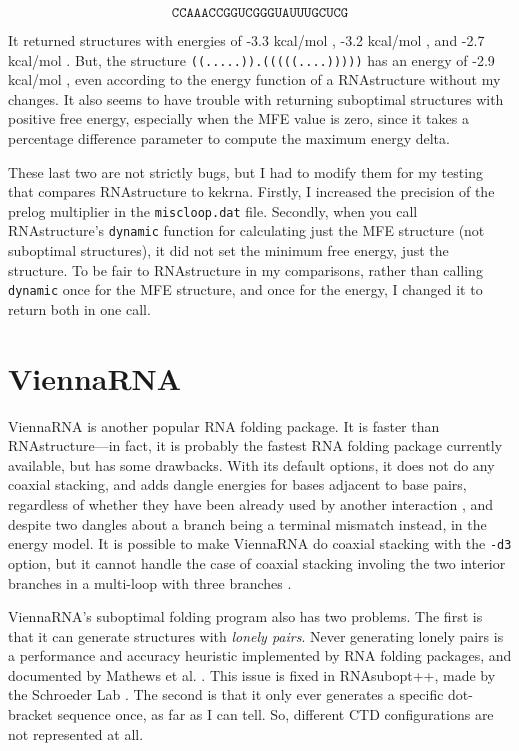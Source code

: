 \documentclass{cshonours}
\def\km{kcal/mol }
\begin{document}
$$\texttt{CCAAACCGGUCGGGUAUUUGCUCG}$$

It returned structures with energies of -3.3 \km, -3.2 \km, and -2.7 
\km. But, the structure \texttt{((.....)).(((((....)))))} has an energy of -2.9 
\km, even according to the energy function of a RNAstructure without my changes. It also seems to have trouble with returning suboptimal structures with positive free energy, especially when the MFE value is zero, since it takes a percentage difference parameter to compute the maximum energy delta.

These last two are not strictly bugs, but I had to modify them for my testing that compares RNAstructure to kekrna. Firstly, I increased the precision of the prelog multiplier in the \texttt{miscloop.dat} file. Secondly, when you call RNAstructure's \texttt{dynamic} function for calculating just the MFE structure (not suboptimal structures), it did not set the minimum free energy, just the structure. To be fair to RNAstructure in my comparisons, rather than calling \texttt{dynamic} once for the MFE structure, and once for the energy, I changed it to return both in one call.

\section{ViennaRNA}
ViennaRNA is another popular RNA folding package. It is faster than RNAstructure---in fact, it is probably the fastest RNA folding package currently available, but has some drawbacks. With its default options, it does not do any coaxial stacking, and adds dangle energies for bases adjacent to base pairs, regardless of whether they have been already used by another interaction \cite{viennaBroken}, and despite two dangles about a branch being a terminal mismatch instead, in the energy model. It is possible to make ViennaRNA do coaxial stacking with the \texttt{-d3} option, but it cannot handle the case of coaxial stacking involing the two interior branches in a multi-loop with three branches \cite{viennaBroken}.

ViennaRNA's suboptimal folding program also has two problems. The first is that it can generate structures with \emph{lonely pairs}. Never generating lonely pairs is a performance and accuracy heuristic implemented by RNA folding packages, and documented by Mathews et al. \cite{mathewsLonely}. This issue is fixed in RNAsubopt++, made by the Schroeder Lab \cite{sjsVienna}. The second is that it only ever generates a specific dot-bracket sequence once, as far as I can tell. So, different CTD configurations are not represented at all.
\end{document}
